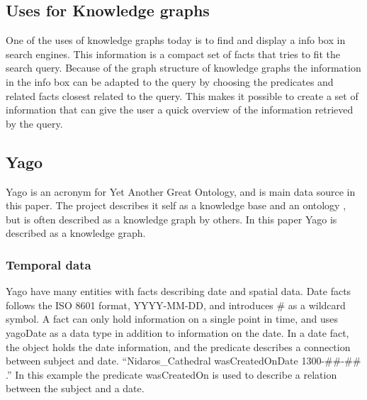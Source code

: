 
\subsection{Uses for Knowledge graphs}
One of the uses of knowledge graphs today is to find and display a info box in search engines. This information is a compact set of facts that tries to fit the search query. Because of the graph structure of knowledge graphs the information in the info box can be adapted to the query by choosing the predicates and related facts closest related to the query. This makes it possible to create a set of information that can give the user a quick overview of the information retrieved by the query.\\

\subsection{Yago}
Yago is an acronym for Yet Another Great Ontology, and is main data source in this paper. The project describes it self as a knowledge base\cite{yago} and an ontology \cite{mahdisoltani:hal-01699874}, but is often described as a knowledge graph by others. In this paper Yago is described as a knowledge graph.\\

\subsubsection{Temporal data}
Yago have many entities with facts describing date and spatial data.\cite{yago} Date facts follows the ISO 8601 format, YYYY-MM-DD, and introduces \# as a wildcard symbol. A fact can only hold information on a single point in time, and uses yagoDate as a data type in addition to information on the date.\cite{yago} In a date fact, the object holds the date information, and the predicate describes a connection between subject and date. ``Nidaros\_Cathedral wasCreatedOnDate 1300-\#\#-\#\# .'' In this example the predicate wasCreatedOn is used to describe a relation between the subject and a date.\\

